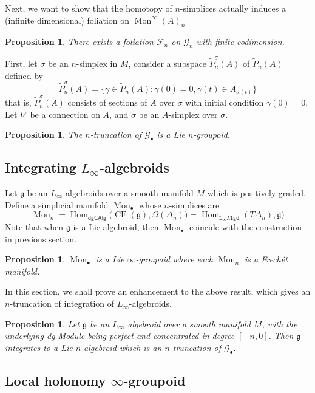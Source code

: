\documentclass[12pt]{amsart}
\newtheorem{prop}[thm]{Proposition}
\theoremstyle{definition}
\theoremstyle{remark}
\numberwithin{equation}{section}
\newcommand{\CG}{{\mathcal G}}
\newcommand{\CF}{{\mathcal F}}
\newcommand{\1}{{\mathbb{1}}}
\newcommand{\g}{\mathfrak{g}}
\newcommand{\CE}{\operatorname{CE}}
\newcommand{\dgcalg}{\mathsf{dgCAlg}}
\newcommand{\lalgdi}{\mathtt{L_{\infty}Algd}}
\newcommand{\Hom}{\operatorname{Hom}}
\newcommand{\mon}{\operatorname{Mon}}
\begin{document}
Next, we want to show that the homotopy of $n$-simplices actually induces a (infinite dimensional) foliation on $\mon^{\infty}(A)_n$
\begin{prop}
 There exists a foliation $\CF_n$ on $\CG_n$ with finite codimension.
\end{prop}

First, let $\sigma$ be an $n$-simplex in $M$, consider a subspace $\tilde{P}_n^{\sigma}(A)$ of $\tilde{P}_n(A)$ defined by
$$
\tilde{P}_n^{\sigma}(A) = \{\gamma \in \tilde{P}_n(A): \gamma(0) = 0, \gamma(t) \in A_{\sigma(t)} \}
$$
that is, $\tilde{P}_n^{\sigma}(A)$ consists of sections of $A$ over $\sigma$ with initial condition $\gamma(0) = 0$. Let $\nabla$ be a connection on $A$, and $\tilde{\sigma}$ be an $A$-simplex over $\sigma$.

\begin{prop}
The $n$-truncation of $\CG_{\bullet}$ is a Lie $n$-groupoid.
\end{prop}

\subsection{Integrating $L_{\infty}$-algebroids}
Let $\g$ be an $L_{\infty}$ algebroids over a smooth manifold $M$ which is positively graded. Define a simplicial manifold $\mon_{\bullet}$ whose $n$-simplices are 
\begin{equation*}
    \mon_n =\Hom_{\dgcalg}\big(\CE(\g), \Omega(\Delta_n)\big)= \Hom_{\lalgdi}(T\Delta_n), \g)
\end{equation*}
Note that when $\g$ is a Lie algebroid, then $\mon_{\bullet}$ coincide with the construction in previous section.

\begin{prop}\cite{SS19}
$\mon_{\bullet}$ is a Lie $\infty$-groupoid where each $\mon_n$ is a Frech{\'e}t manifold.
\end{prop}
In this section, we shall prove an enhancement to the above result, which gives an $n$-truncation of integration of $L_{\infty}$-algebroids.

\begin{prop}
Let $\g$ be an $L_{\infty}$ algebroid over a smooth manifold $M$, with the underlying dg Module being perfect and concentrated in degree $[-n, 0]$. Then $\g$ integrates to a Lie $n$-algebroid which is an $n$-truncation of $\CG_{\bullet}$.
\end{prop}

\subsection{Local holonomy $\infty$-groupoid}
\end{document}
